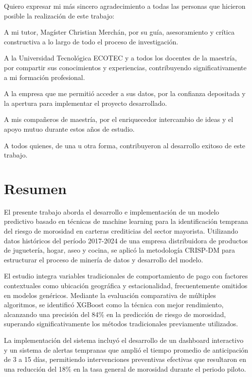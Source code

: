 Quiero expresar mi más sincero agradecimiento a todas las personas que hicieron posible la realización de este trabajo:

A mi tutor, Magíster Christian Merchán, por su guía, asesoramiento y crítica constructiva a lo largo de todo el proceso de investigación.

A la Universidad Tecnológica ECOTEC y a todos los docentes de la maestría, por compartir sus conocimientos y experiencias, contribuyendo significativamente a mi formación profesional.

A la empresa que me permitió acceder a sus datos, por la confianza depositada y la apertura para implementar el proyecto desarrollado.

A mis compañeros de maestría, por el enriquecedor intercambio de ideas y el apoyo mutuo durante estos años de estudio.

A todos quienes, de una u otra forma, contribuyeron al desarrollo exitoso de este trabajo.

\newpage

\chapter*{Resumen}
\thispagestyle{empty}

El presente trabajo aborda el desarrollo e implementación de un modelo predictivo basado en técnicas de machine learning para la identificación temprana del riesgo de morosidad en carteras crediticias del sector mayorista. Utilizando datos históricos del período 2017-2024 de una empresa distribuidora de productos de juguetería, hogar, aseo y cocina, se aplicó la metodología CRISP-DM para estructurar el proceso de minería de datos y desarrollo del modelo.

El estudio integra variables tradicionales de comportamiento de pago con factores contextuales como ubicación geográfica y estacionalidad, frecuentemente omitidos en modelos genéricos. Mediante la evaluación comparativa de múltiples algoritmos, se identificó XGBoost como la técnica con mejor rendimiento, alcanzando una precisión del 84\% en la predicción de riesgo de morosidad, superando significativamente los métodos tradicionales previamente utilizados.

La implementación del sistema incluyó el desarrollo de un dashboard interactivo y un sistema de alertas tempranas que amplió el tiempo promedio de anticipación de 3 a 15 días, permitiendo intervenciones preventivas efectivas que resultaron en una reducción del 18\% en la tasa general de morosidad durante el periodo piloto.

